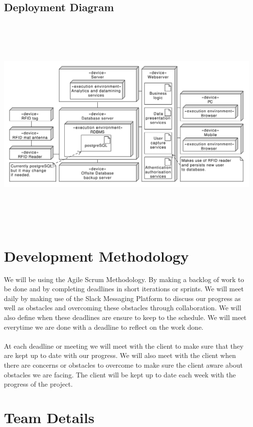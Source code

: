 \documentclass{article}
\begin{document}
\subsection{Deployment Diagram} 
\includegraphics[width=18cm,height=11cm,keepaspectratio]{ETA-Deployment.pdf}

\section{Development Methodology}
We will be using the Agile Scrum Methodology. By making a backlog of work to be done and by completing deadlines in short iterations or sprints. We will meet daily by making use of the Slack Messaging Platform to discuss our progress as well as obstacles and overcoming these obstacles through collaboration. We will also define when these deadlines are ensure to keep to the schedule. We will meet everytime we are done with a deadline to reflect on the work done. \\ \\
At each deadline or meeting we will meet with the client to make sure that they are kept up to date with our progress. We will also meet with the client when there are concerns or obstacles to overcome to make sure the client aware about obstacles we are facing. The client will be kept up to date each week with the progress of the project.

\newpage
\section{Team Details}
\end{document}
